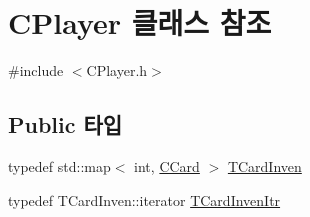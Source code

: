 \hypertarget{class_c_player}{\section{\-C\-Player 클래스 참조}
\label{class_c_player}
}


{\ttfamily \#include $<$\-C\-Player.\-h$>$}

\subsection*{\-Public 타입}
\begin{DoxyCompactItemize}
\item 
typedef std\-::map$<$ int, \hyperlink{class_c_card}{\-C\-Card} $>$ \hyperlink{class_c_player_afc2e175de7122626d649da43d3db40a2}{\-T\-Card\-Inven}
\item 
typedef \-T\-Card\-Inven\-::iterator \hyperlink{class_c_player_a956d26e71ea17e57ac43279eab7eaf3b}{\-T\-Card\-Inven\-Itr}
\end{DoxyCompactItemize}
